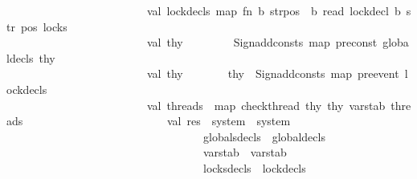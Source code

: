 \begin{isabellebody}
\ \ \ \ \ \ \ \ \ \ \ \ \ \ \ \ \ \ \ \ \ \ \ \ \ val\ lock{\isacharunderscore}{\kern0pt}decls{\isacharprime}{\kern0pt}{\isacharequal}{\kern0pt}\ map\ {\isacharparenleft}{\kern0pt}fn\ {\isacharparenleft}{\kern0pt}b{\isacharcomma}{\kern0pt}\ {\isacharparenleft}{\kern0pt}str{\isacharcomma}{\kern0pt}pos{\isacharparenright}{\kern0pt}{\isacharparenright}{\kern0pt}\ {\isacharequal}{\kern0pt}{\isachargreater}{\kern0pt}\ {\isacharparenleft}{\kern0pt}b{\isacharcomma}{\kern0pt}\ read\ {\isachardoublequote}{\kern0pt}lock{\isacharunderscore}{\kern0pt}decl{\isachardoublequote}{\kern0pt}\ b\ str{\isacharcomma}{\kern0pt}\ pos{\isacharparenright}{\kern0pt}{\isacharparenright}{\kern0pt}\ locks\isanewline
\ \ \ \ \ \ \ \ \ \ \ \ \ \ \ \ \ \ \ \ \ \ \ \ \ val\ thy{\isacharprime}{\kern0pt}\ \ \ \ \ \ \ \ {\isacharequal}{\kern0pt}\ Sign{\isachardot}{\kern0pt}add{\isacharunderscore}{\kern0pt}consts\ {\isacharparenleft}{\kern0pt}map\ pre{\isacharunderscore}{\kern0pt}const{}\ global{\isacharunderscore}{\kern0pt}decls{\isacharprime}{\kern0pt}{\isacharparenright}{\kern0pt}\ thy\isanewline
\ \ \ \ \ \ \ \ \ \ \ \ \ \ \ \ \ \ \ \ \ \ \ \ \ val\ thy{\isacharprime}{\kern0pt}{\isacharprime}{\kern0pt}\ \ \ \ \ \ \ {\isacharequal}{\kern0pt}\ thy{\isacharprime}{\kern0pt}\ {\isacharbar}{\kern0pt}{\isachargreater}{\kern0pt}\ Sign{\isachardot}{\kern0pt}add{\isacharunderscore}{\kern0pt}consts\ {\isacharparenleft}{\kern0pt}map\ pre{\isacharunderscore}{\kern0pt}event\ lock{\isacharunderscore}{\kern0pt}decls{\isacharprime}{\kern0pt}{\isacharparenright}{\kern0pt}\isanewline
\isanewline
\ \ \ \ \ \ \ \ \ \ \ \ \ \ \ \ \ \ \ \ \ \ \ \ \ val\ threads{\isacharprime}{\kern0pt}\ {\isacharequal}{\kern0pt}\ map\ {\isacharparenleft}{\kern0pt}check{\isacharunderscore}{\kern0pt}thread\ thy\ thy{\isacharprime}{\kern0pt}{\isacharprime}{\kern0pt}\ varstab{\isacharparenright}{\kern0pt}\ threads\ \isanewline
\ \ \ \ \ \ \ \ \ \ \ \ \ \ \ \ \ \ \ \ \ \ \ \ val\ res\ {\isacharequal}{\kern0pt}\ {\isacharbraceleft}{\kern0pt}system\ {\isacharequal}{\kern0pt}\ system{\isacharcomma}{\kern0pt}\isanewline
\ \ \ \ \ \ \ \ \ \ \ \ \ \ \ \ \ \ \ \ \ \ \ \ \ \ \ \ \ \ \ \ \ \ \ globals{\isacharunderscore}{\kern0pt}decls\ {\isacharequal}{\kern0pt}\ global{\isacharunderscore}{\kern0pt}decls{\isacharprime}{\kern0pt}{\isacharcomma}{\kern0pt}\isanewline
\ \ \ \ \ \ \ \ \ \ \ \ \ \ \ \ \ \ \ \ \ \ \ \ \ \ \ \ \ \ \ \ \ \ \ varstab\ {\isacharequal}{\kern0pt}\ varstab{\isacharcomma}{\kern0pt}\isanewline
\ \ \ \ \ \ \ \ \ \ \ \ \ \ \ \ \ \ \ \ \ \ \ \ \ \ \ \ \ \ \ \ \ \ \ locks{\isacharunderscore}{\kern0pt}decls\ {\isacharequal}{\kern0pt}\ lock{\isacharunderscore}{\kern0pt}decls{\isacharprime}{\kern0pt}{\isacharcomma}{\kern0pt}\isanewline

\end{isabellebody}
